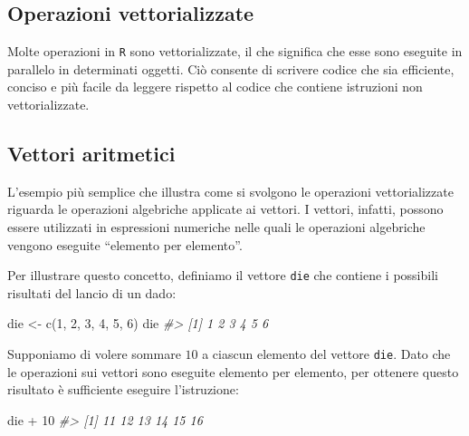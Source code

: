 \documentclass[
  11pt,
]{krantz}
\makeatletter
\newenvironment{Shaded}{\begin{snugshade}}{\end{snugshade}}
\newcommand{\CommentTok}[1]{\textcolor[rgb]{0.37,0.37,0.37}{\textit{#1}}}
\newcommand{\DecValTok}[1]{\textcolor[rgb]{0.06,0.06,0.06}{#1}}
\newcommand{\FunctionTok}[1]{\textcolor[rgb]{0,0,0}{#1}}
\newcommand{\NormalTok}[1]{#1}
\newcommand{\OtherTok}[1]{\textcolor[rgb]{0.37,0.37,0.37}{#1}}
\newcommand{\SpecialCharTok}[1]{\textcolor[rgb]{0,0,0}{#1}}
\newenvironment{kframe}{%
\medskip{}
\setlength{\fboxsep}{.8em}
 \def\at@end@of@kframe{}%
 \ifinner\ifhmode%
  \def\at@end@of@kframe{\end{minipage}}%
  \begin{minipage}{\columnwidth}%
 \fi\fi%
 \def\FrameCommand##1{\hskip\@totalleftmargin \hskip-\fboxsep
 \colorbox{shadecolor}{##1}\hskip-\fboxsep
     \hskip-\linewidth \hskip-\@totalleftmargin \hskip\columnwidth}%
 \MakeFramed {\advance\hsize-\width
   \@totalleftmargin\z@ \linewidth\hsize
   \@setminipage}}%
 {\par\unskip\endMakeFramed%
 \at@end@of@kframe}
\renewenvironment{Shaded}{\begin{kframe}}{\end{kframe}}
\theoremstyle{definition}
\theoremstyle{definition}
\theoremstyle{definition}
\theoremstyle{definition}
\theoremstyle{remark}
\makeatother
\begin{document}
\hypertarget{operazioni-vettorializzate}{%
\subsection{Operazioni vettorializzate}\label{operazioni-vettorializzate}}

Molte operazioni in \texttt{R} sono vettorializzate, il che significa che esse sono eseguite in parallelo in determinati oggetti. Ciò consente di scrivere codice che sia efficiente, conciso e più facile da leggere rispetto al codice che contiene istruzioni non vettorializzate.

\hypertarget{vettori-aritmetici}{%
\subsection{Vettori aritmetici}\label{vettori-aritmetici}}

L'esempio più semplice che illustra come si svolgono le operazioni vettorializzate riguarda le operazioni algebriche applicate ai vettori. I vettori, infatti, possono essere utilizzati in espressioni numeriche nelle quali le operazioni algebriche vengono eseguite ``elemento per elemento''.

Per illustrare questo concetto, definiamo il vettore \texttt{die} che contiene i possibili risultati del lancio di un dado:

\begin{Shaded}
\begin{Highlighting}[]
\NormalTok{die }\OtherTok{\textless{}{-}} \FunctionTok{c}\NormalTok{(}\DecValTok{1}\NormalTok{, }\DecValTok{2}\NormalTok{, }\DecValTok{3}\NormalTok{, }\DecValTok{4}\NormalTok{, }\DecValTok{5}\NormalTok{, }\DecValTok{6}\NormalTok{)}
\NormalTok{die}
\CommentTok{\#\textgreater{} [1] 1 2 3 4 5 6}
\end{Highlighting}
\end{Shaded}

Supponiamo di volere sommare \(10\) a ciascun elemento del vettore \texttt{die}. Dato che le operazioni sui vettori sono eseguite elemento per elemento, per ottenere questo risultato è sufficiente eseguire l'istruzione:

\begin{Shaded}
\begin{Highlighting}[]
\NormalTok{die }\SpecialCharTok{+} \DecValTok{10}
\CommentTok{\#\textgreater{} [1] 11 12 13 14 15 16}
\end{Highlighting}
\end{Shaded}
\end{document}
